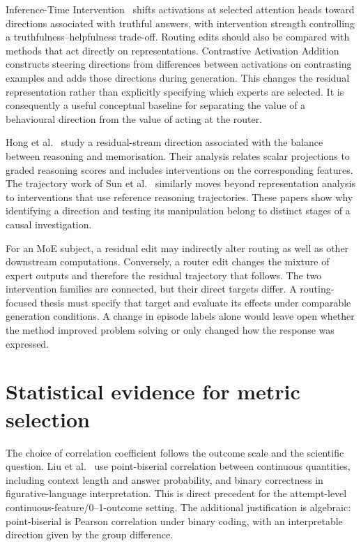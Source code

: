 \documentclass[12pt,a4paper,twoside,openright]{book}
\begin{document}
Inference-Time Intervention~\cite{li2023iti} shifts activations at selected
attention heads toward directions associated with truthful answers, with
intervention strength controlling a truthfulness--helpfulness trade-off.
Routing edits should also be compared with methods that act directly on
representations. Contrastive Activation Addition~\cite{rimsky2024caa}
constructs steering directions from differences between activations on
contrasting examples and adds those directions during generation. This changes
the residual representation rather than explicitly specifying which experts
are selected. It is consequently a useful conceptual baseline for separating
the value of a behavioural direction from the value of acting at the router.

Hong et al.~\cite{hong2025interplay} study a residual-stream direction
associated with the balance between reasoning and memorisation. Their analysis
relates scalar projections to graded reasoning scores and includes
interventions on the corresponding features. The trajectory work of
Sun et al.~\cite{sun2026trajectories} similarly moves beyond representation
analysis to interventions that use reference reasoning trajectories. These papers
show why identifying a direction and testing its manipulation belong to
distinct stages of a causal investigation.

For an MoE subject, a residual edit may indirectly alter routing as well as
other downstream computations. Conversely, a router edit changes the mixture
of expert outputs and therefore the residual trajectory that follows.
The two intervention families are connected, but their direct targets differ.
A routing-focused thesis must specify that target and evaluate its effects
under comparable generation conditions. A change in episode labels alone
would leave open whether the method improved problem solving or only changed
how the response was expressed.

\section{Statistical evidence for metric selection}
\label{sec:related-statistics}

The choice of correlation coefficient follows the outcome scale and the
scientific question. Liu et al.~\cite{liu2022figurative} use point-biserial
correlation between continuous quantities, including context length and answer
probability, and binary correctness in figurative-language interpretation.
This is direct precedent for the attempt-level
continuous-feature/0--1-outcome setting. The additional justification is
algebraic: point-biserial is Pearson correlation under binary coding, with
an interpretable direction given by the group difference.
\end{document}
